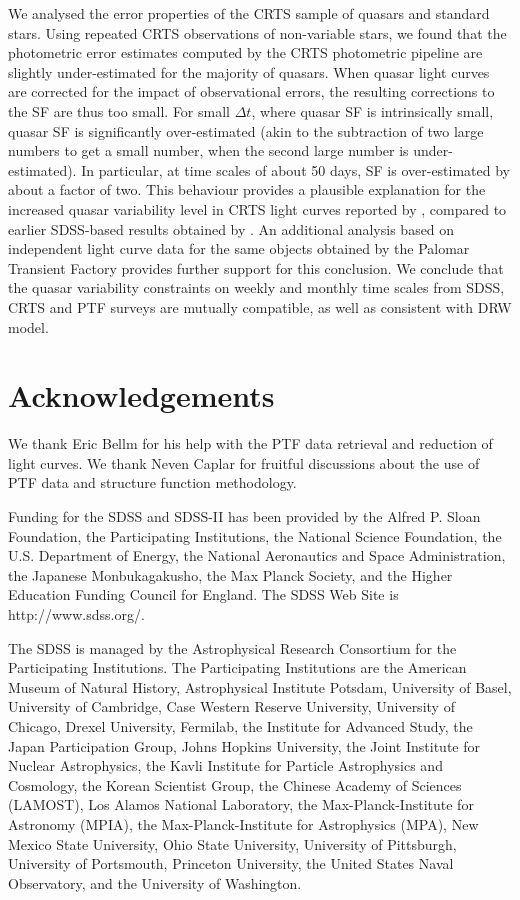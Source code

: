 \documentclass[fleqn,usenatbib]{mnras}
\begin{document}
We analysed the error properties of the CRTS sample of quasars and standard stars. Using 
repeated CRTS observations of non-variable stars, we found that the photometric error estimates 
computed by the CRTS photometric pipeline are slightly under-estimated for the majority of
quasars. When quasar light curves are corrected for the impact of observational errors, the
resulting corrections to the SF are thus too small. For small $\Delta t$, where quasar SF is intrinsically 
small, quasar SF is significantly over-estimated (akin to the subtraction of two large numbers 
to get a small number, when the second large number is under-estimated). In particular, at time
scales of about 50 days, SF is over-estimated by about a factor of two. This behaviour provides 
a plausible explanation for the increased quasar variability level in CRTS light curves reported 
by \cite{graham2014}, compared to earlier SDSS-based results obtained by \cite{macleod2010}.
An additional analysis based on independent light curve data for the same objects obtained by 
the Palomar Transient Factory provides further support for this conclusion. We conclude that
the quasar variability constraints on weekly and monthly time scales from SDSS, CRTS and PTF 
surveys are mutually compatible, as well as consistent with DRW model. 



\section*{Acknowledgements}

We thank Eric Bellm for his help with the PTF data retrieval and reduction of light curves.  
We thank Neven Caplar for fruitful discussions about the use of PTF data and structure 
function methodology. 

Funding for the SDSS and SDSS-II has been provided by the Alfred P. Sloan Foundation, 
the Participating Institutions, the National Science Foundation, the U.S. Department of 
Energy, the National Aeronautics and Space Administration, the Japanese Monbukagakusho,
the Max Planck Society, and the Higher Education Funding Council for England. The SDSS 
Web Site is http://www.sdss.org/.

The SDSS is managed by the Astrophysical Research Consortium for the Participating Institutions. 
The Participating Institutions are the American Museum of Natural History, Astrophysical Institute 
Potsdam, University of Basel, University of Cambridge, Case Western Reserve University, University
of Chicago, Drexel University, Fermilab, the Institute for Advanced Study, the Japan Participation 
Group, Johns Hopkins University, the Joint Institute for Nuclear Astrophysics, the Kavli Institute for 
Particle Astrophysics and Cosmology, the Korean Scientist Group, the Chinese Academy of Sciences 
(LAMOST), Los Alamos National Laboratory, the Max-Planck-Institute for Astronomy (MPIA), the 
Max-Planck-Institute for Astrophysics (MPA), New Mexico State University, Ohio State University, 
University of Pittsburgh, University of Portsmouth, Princeton University, the United States Naval
Observatory, and the University of Washington. 
\end{document}
